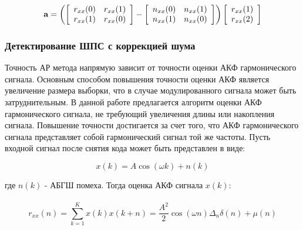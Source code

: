 \begin{center}
\begin{equation}
	\label{eq:lpc_gps_1}
	{\bf a} = 
		\left(
			\left[ \begin{array}{cc}
				r_{xx}(0) & r_{xx}(1) \\
				r_{xx}(1) & r_{xx}(0)
			\end{array} \right] -
			\left[ \begin{array}{cc}
				n_{xx}(0) & n_{xx}(1) \\
				n_{xx}(1) & n_{xx}(0)
			\end{array} \right] 
		\right)
		\left[ \begin{array}{c}
			r_{xx}(1) \\
			r_{xx}(2)
		\end{array} \right]
\end{equation}
\end{center}

\subsubsection{Детектирование ШПС с коррекцией шума}
Точность АР метода напрямую зависит от точности оценки АКФ гармонического сигнала. Основным способом повышения точности оценки
АКФ является увеличение размера выборки, что в случае модулированного сигнала может быть затруднительным. В данной работе
предлагается алгоритм оценки АКФ гармонического сигнала, не требующий увеличения длины или накопления сигнала.
Повышение точности достигается за счет того, что АКФ гармонического сигнала представляет собой гармонический сигнал той же частоты.
Пусть входной сигнал после снятия кода может быть представлен в виде:

\begin{center}
\begin{equation}
	x(k)=A \cos{(\omega k)} + n(k)
\end{equation}
\end{center}

где ${n(k)}$ - АБГШ помеха. Тогда оценка АКФ сигнала ${x(k)}$:

\begin{center}
\begin{equation}
	\hat{r_{xx}(n) = \sum \limits_{k=1}^{K} x(k)x(k+n) = \frac{A^2}{2} \cos{(\omega{n})} \Delta_n \delta{(n)} + \mu{(n)}}
\end{equation}
\end{center}

